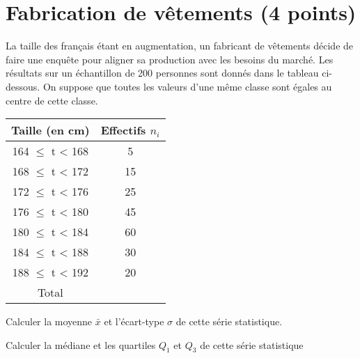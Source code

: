 \section{Fabrication de vêtements (4 points)}

La taille des français étant en augmentation, un fabricant de vêtements décide de faire une enquête pour aligner sa production avec les besoins du marché. Les résultats sur un échantillon de 200 personnes sont donnés dans le tableau ci-dessous. On suppose que toutes les valeurs d'une même classe sont égales au centre de cette classe.


\begin{center}
	\begin{tabular}{|@{\ \ }c@{\ \ }|@{\ \ }c@{\ \ }|}
	\hline
	Taille (en cm)     & Effectifs $n_i$ \\ \hline
	164 $\leq$ t < 168 & 5               \\ \hline
	168 $\leq$ t < 172 & 15              \\ \hline
	172 $\leq$ t < 176 & 25              \\ \hline
	176 $\leq$ t < 180 & 45              \\ \hline
	180 $\leq$ t < 184 & 60              \\ \hline
	184 $\leq$ t < 188 & 30              \\ \hline
	188 $\leq$ t < 192 & 20              \\ \hline
	Total              &                 \\ \hline
\end{tabular}
\end{center}


\begin{questions}
	\question[1] Calculer la moyenne $\bar{x}$ et l'écart-type $\sigma$ de cette série statistique.
	
	\question[1] Calculer la médiane et les quartiles $Q_1$ et $Q_3$ de cette série statistique
	
	\question[2] 
	
		
\end{questions}